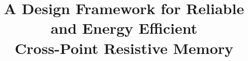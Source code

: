 \documentclass[9pt,conference,twocolumn]{IEEEtran}
\begin{document}
\title{\vspace{-0pt}A Design Framework for Reliable and Energy Efficient\\Cross-Point Resistive Memory}
\maketitle
\vspace{-20pt}


%


%

%




\end{document}
